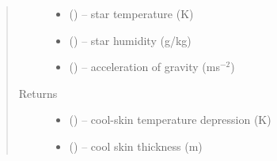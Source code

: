 \documentclass[letterpaper,10pt,english]{sphinxmanual}
\begin{document}
\begin{fulllineitems}
\begin{quote}
\begin{description}
\begin{itemize}
\item {} 
 (\href{https://docs.python.org/3/library/functions.html\#float}{}) -- star temperature (K)

\item {} 
 (\href{https://docs.python.org/3/library/functions.html\#float}{}) -- star humidity (g/kg)

\item {} 
 (\href{https://docs.python.org/3/library/functions.html\#float}{}) -- acceleration of gravity (ms$^{-2}$)

\end{itemize}

\item[{Returns}] \leavevmode
\begin{itemize}
\item {} 
 (\href{https://docs.python.org/3/library/functions.html\#float}{}) -- cool-skin temperature depression (K)

\item {} 
 (\href{https://docs.python.org/3/library/functions.html\#float}{}) -- cool skin thickness (m)

\end{itemize}

\end{description}\end{quote}
\end{fulllineitems}

\end{document}
